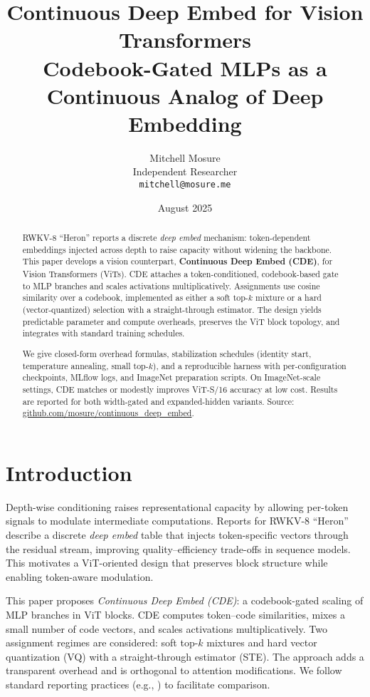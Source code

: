 \documentclass[11pt]{article}
\title{\textbf{Continuous Deep Embed for Vision Transformers}\\
\large Codebook-Gated MLPs as a Continuous Analog of Deep Embedding}
\author{
  \normalsize Mitchell Mosure\\
  \normalsize Independent Researcher\\
  \normalsize \texttt{mitchell@mosure.me}
}
\date{August 2025}
\begin{document}
\maketitle

\begin{abstract}
RWKV-8 ``Heron'' reports a discrete \emph{deep embed} mechanism: token-dependent embeddings injected across depth to raise capacity without widening the backbone. This paper develops a vision counterpart, \textbf{Continuous Deep Embed (CDE)}, for Vision Transformers (ViTs). CDE attaches a token-conditioned, codebook-based gate to MLP branches and scales activations multiplicatively. Assignments use cosine similarity over a codebook, implemented as either a soft top-$k$ mixture or a hard (vector-quantized) selection with a straight-through estimator. The design yields predictable parameter and compute overheads, preserves the ViT block topology, and integrates with standard training schedules.

We give closed-form overhead formulas, stabilization schedules (identity start, temperature annealing, small top-$k$), and a reproducible harness with per-configuration checkpoints, MLflow logs, and ImageNet preparation scripts. On ImageNet-scale settings, CDE matches or modestly improves ViT-S/16 accuracy at low cost. Results are reported for both width-gated and expanded-hidden variants. Source: \href{https://github.com/mosure/continuous_deep_embed}{github.com/mosure/continuous\_deep\_embed}.
\end{abstract}

\section{Introduction}
Depth-wise conditioning raises representational capacity by allowing per-token signals to modulate intermediate computations. Reports for RWKV-8 ``Heron'' describe a discrete \emph{deep embed} table that injects token-specific vectors through the residual stream, improving quality--efficiency trade-offs in sequence models. This motivates a ViT-oriented design that preserves block structure while enabling token-aware modulation.

This paper proposes \emph{Continuous Deep Embed (CDE)}: a codebook-gated scaling of MLP branches in ViT blocks. CDE computes token--code similarities, mixes a small number of code vectors, and scales activations multiplicatively. Two assignment regimes are considered: soft top-$k$ mixtures and hard vector quantization (VQ) with a straight-through estimator (STE). The approach adds a transparent overhead and is orthogonal to attention modifications. We follow standard reporting practices (e.g., \citet{vaswani2017attention}) to facilitate comparison.
\end{document}
